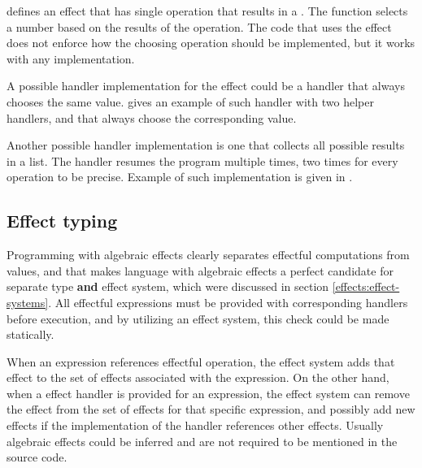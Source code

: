 defines an effect  that has single operation  that results in a . The function  selects a number based on the results of the  operation. The code that uses the effect does not enforce how the choosing operation should be implemented, but it works with any implementation.



A possible handler implementation for the  effect could be a handler that always chooses the same  value.  gives an example of such handler with two helper handlers,  and  that always choose the corresponding value.



Another possible handler implementation is one that collects all possible results in a list.
The handler resumes the program multiple times, two times for every  operation to be precise. Example of such implementation is given in .




\subsection{Effect typing}
Programming with algebraic effects clearly separates effectful computations from values, and that makes language with algebraic effects a perfect candidate for separate type \textbf{and} effect system, which were discussed in section \ref{effects:effect-systems}. All effectful expressions must be provided with corresponding handlers before execution, and by utilizing an effect system, this check could be made statically. 

When an expression references effectful operation, the effect system adds that effect to the set of effects associated with the expression. On the other hand, when a effect handler is provided for an expression, the effect system can remove the effect from the set of effects for that specific expression, and possibly add new effects if the implementation of the handler references other effects. Usually algebraic effects could be inferred and are not required to be mentioned in the source code.

